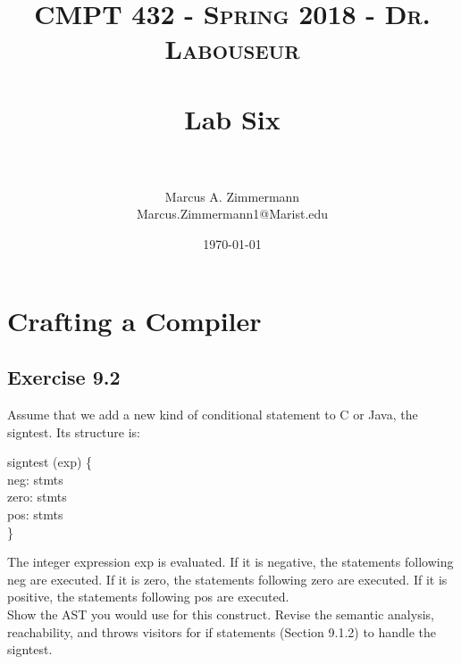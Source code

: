 \documentclass[letterpaper, 10pt,DIV=13]{scrartcl}
\title{	
   \normalfont \normalsize
   \textsc{CMPT 432 - Spring 2018 - Dr. Labouseur} \\[10pt] %
   \horrule{0.5pt} \\[0.25cm] 	%
   \huge Lab Six  \\     	    %
   \horrule{0.5pt} \\[0.25cm] 	%
}
\author{Marcus A. Zimmermann \\ \normalsize Marcus.Zimmermann1@Marist.edu}
\date{\normalsize\today} 	%
\numberwithin{equation}{section} %
\numberwithin{figure}{section} %
\numberwithin{table}{section} %
\begin{document}
\maketitle %

\section*{Crafting a Compiler}
\subsection*{Exercise 9.2}
Assume that we add a new kind of conditional statement to C or Java,
the signtest. Its structure is: \\

\begin{algorithm}[H]
	\SetAlgoLined
	signtest (exp) \{ \\
		\Indp
		neg: stmts \\
		zero: stmts \\
		pos: stmts \\
		\Indm
	\} \\
\end{algorithm}

The integer expression exp is evaluated. If it is negative, the statements following neg are executed. If it is zero, the statements following zero are executed. If it is positive, the statements following pos are executed. \\

Show the AST you would use for this construct. Revise the semantic analysis, reachability, and throws visitors for if statements (Section 9.1.2) to handle the signtest. \\


%
% 
\end{document}
